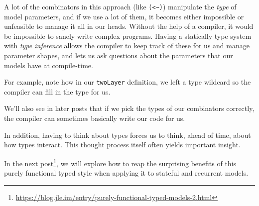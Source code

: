 \documentclass[]{article}
\renewcommand{\href}[2]{#2\footnote{\url{#1}}}
\begin{document}
\begin{enumerate}
  A lot of the combinators in this approach (like
  \texttt{(\textless{}\textasciitilde{})}) manipulate the \emph{type} of model
  parameters, and if we use a lot of them, it becomes either impossible or
  unfeasible to manage it all in our heads. Without the help of a compiler, it
  would be impossible to sanely write complex programs. Having a statically type
  system with \emph{type inference} allows the compiler to keep track of these
  for us and manage parameter shapes, and lets us ask questions about the
  parameters that our models have at compile-time.

  For example, note how in our \texttt{twoLayer} definition, we left a type
  wildcard so the compiler can fill in the type for us.

  We'll also see in later posts that if we pick the types of our combinators
  correctly, the compiler can sometimes basically write our code for us.

  In addition, having to think about types forces us to think, ahead of time,
  about how types interact. This thought process itself often yields important
  insight.
\end{enumerate}

In the
\href{https://blog.jle.im/entry/purely-functional-typed-models-2.html}{next
post}, we will explore how to reap the surprising benefits of this purely
functional typed style when applying it to stateful and recurrent models.
\end{document}
